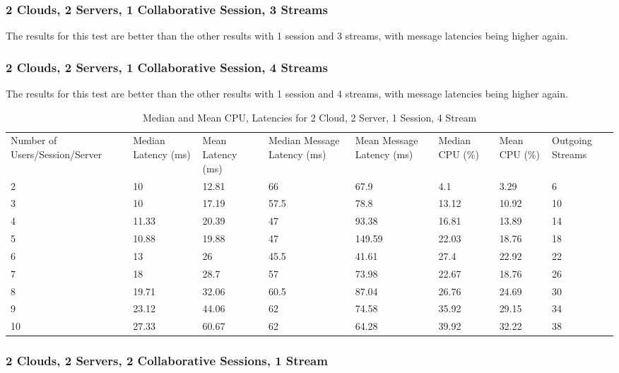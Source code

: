 \subsubsection{2 Clouds, 2 Servers, 1 Collaborative Session, 3 Streams}

The results for this test are better than the other results with 1 session and 3 streams, with message latencies being higher again.

\subsubsection{2 Clouds, 2 Servers, 1 Collaborative Session, 4 Streams}

The results for this test are better than the other results with 1 session and 4 streams, with message latencies being higher again.

\begin{table}
\caption{Median and Mean CPU, Latencies for 2 Cloud, 2 Server, 1 Session, 4 Stream}
\label{table:2cld_2serv_1sess_4str}
\begin{tabu} to\linewidth{|X[c]|X[c]|X[c]|X[c]|X[c]|X[c]|X[c]|X[c]|}
\everyrow{\hline}
\hline
Number of Users/Session/Server & Median Latency (ms) & Mean Latency (ms) & Median Message Latency (ms) & Mean Message Latency (ms) & Median CPU (\%) & Mean CPU (\%) & Outgoing Streams\\
2 & 10 & 12.81 & 66 & 67.9 & 4.1 & 3.29 & 6 \\
3 & 10 & 17.19 & 57.5 & 78.8 & 13.12 & 10.92 & 10 \\
4 & 11.33 & 20.39 & 47 & 93.38 & 16.81 & 13.89 & 14 \\
5 & 10.88 & 19.88 & 47 & 149.59 & 22.03 & 18.76 & 18 \\
6 & 13 & 26 & 45.5 & 41.61 & 27.4 & 22.92 & 22 \\
7 & 18 & 28.7 & 57 & 73.98 & 22.67 & 18.76 & 26 \\
8 & 19.71 & 32.06 & 60.5 & 87.04 & 26.76 & 24.69 & 30 \\
9 & 23.12 & 44.06 & 62 & 74.58 & 35.92 & 29.15 & 34 \\
10 & 27.33 & 60.67 & 62 & 64.28 & 39.92 & 32.22 & 38 \\
\end{tabu}
\end{table}

\subsubsection{2 Clouds, 2 Servers, 2 Collaborative Sessions, 1 Stream}


